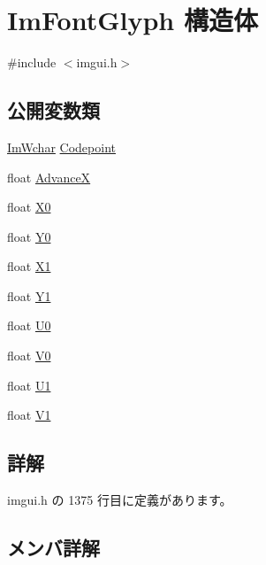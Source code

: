 \hypertarget{struct_im_font_glyph}{}\section{Im\+Font\+Glyph 構造体}
\label{struct_im_font_glyph}


{\ttfamily \#include $<$imgui.\+h$>$}

\subsection*{公開変数類}
\begin{DoxyCompactItemize}
\item 
\mbox{\hyperlink{imgui_8h_af2c7badaf05a0008e15ef76d40875e97}{Im\+Wchar}} \mbox{\hyperlink{struct_im_font_glyph_a3ff56d019068137a3df514caa3961421}{Codepoint}}
\item 
float \mbox{\hyperlink{struct_im_font_glyph_a11bfab7bcdb497fe2d649745c7d39b33}{AdvanceX}}
\item 
float \mbox{\hyperlink{struct_im_font_glyph_a1e93bf7292c052549972fc46646ff104}{X0}}
\item 
float \mbox{\hyperlink{struct_im_font_glyph_ac1deecd5b352949f30d396a58b68dd09}{Y0}}
\item 
float \mbox{\hyperlink{struct_im_font_glyph_a1d907170d807c5e5f2a43d74b99f0d89}{X1}}
\item 
float \mbox{\hyperlink{struct_im_font_glyph_aa6a0440694ae06c4cf03316498327bd2}{Y1}}
\item 
float \mbox{\hyperlink{struct_im_font_glyph_a3c9d90fb39f6beaf9d69413fa4c8366f}{U0}}
\item 
float \mbox{\hyperlink{struct_im_font_glyph_a26b7b7b9ee43ab67e98af9ea1131ce20}{V0}}
\item 
float \mbox{\hyperlink{struct_im_font_glyph_aaca9625f2d6972016e05fed583db85b0}{U1}}
\item 
float \mbox{\hyperlink{struct_im_font_glyph_a3d28904aad639835cdff3e4416663d7c}{V1}}
\end{DoxyCompactItemize}


\subsection{詳解}


 imgui.\+h の 1375 行目に定義があります。



\subsection{メンバ詳解}
\mbox{\label{struct_im_font_glyph_a11bfab7bcdb497fe2d649745c7d39b33}} 
